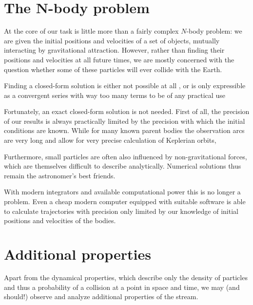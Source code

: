 


\section{The N-body problem} \label{mN}
    At the core of our task is little more than a fairly complex $N$-body problem: we are given
    the initial positions and velocities of a set of objects, mutually interacting by gravitational attraction.
    However, rather than finding their positions and velocities at all future times, we are mostly concerned
    with the question whether some of these particles will ever collide with the Earth.

    Finding a closed-form solution is either not possible at all \cite{...}, or is only expressible
    as a convergent series with way too many terms to be of any practical use \cite{beloriszky-1930}

    Fortunately, an exact closed-form solution is not needed. First of all, the precision of our results
    is always practically limited by the precision with which the initial conditions are known.
    While for many known parent bodies the observation arcs are very long and allow for very precise
    calculation of Keplerian orbits,

    Furthermore, small particles are often also influenced by non-gravitational forces,
    which are themselves difficult to describe analytically.
    Numerical solutions thus remain the astronomer's best friends.

    With modern integrators and available computational power this is no longer a problem.
    Even a cheap modern computer equipped with suitable software is able to calculate trajectories
    with precision only limited by our knowledge of initial positions and velocities of the bodies.

\section{Additional properties} \label{ma}
    Apart from the dynamical properties, which describe only the density of particles
    and thus a probability of a collision at a point in space and time,
    we may (and should!) observe and analyze additional properties of the stream.

